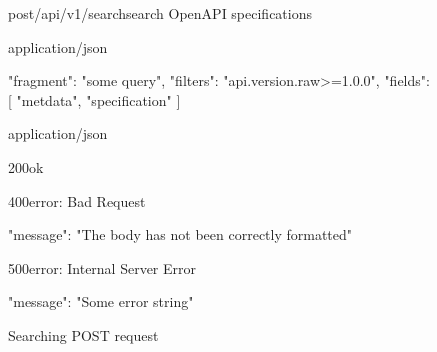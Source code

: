 \begin{figure}[!h]
    \begin{apiRoute}{post}{/api/v1/search}{search OpenAPI specifications}
        \begin{routeParameter}
        \end{routeParameter}

        \begin{routeRequest}{application/json}
            \begin{routeRequestBody}
{
    "fragment": "some query",
    "filters": "api.version.raw>=1.0.0",
    "fields": [ "metdata", "specification" ]
}
            \end{routeRequestBody}
        \end{routeRequest}

        \begin{routeResponse}{application/json}
            \begin{routeResponseItem}{200}{ok}
                \begin{routeResponseItemBody}
                \end{routeResponseItemBody}
            \end{routeResponseItem}

            \begin{routeResponseItem}{400}{error: Bad Request}
                \begin{routeResponseItemBody}
{
    "message": "The body has not been correctly formatted"
}
                \end{routeResponseItemBody}
            \end{routeResponseItem}

            \begin{routeResponseItem}{500}{error: Internal Server Error}
                \begin{routeResponseItemBody}
{
    "message": "Some error string"
}
                \end{routeResponseItemBody}
            \end{routeResponseItem}
        \end{routeResponse}
    \end{apiRoute}

    \caption{Searching POST request}
    \label{fig:searching-request}
\end{figure}

